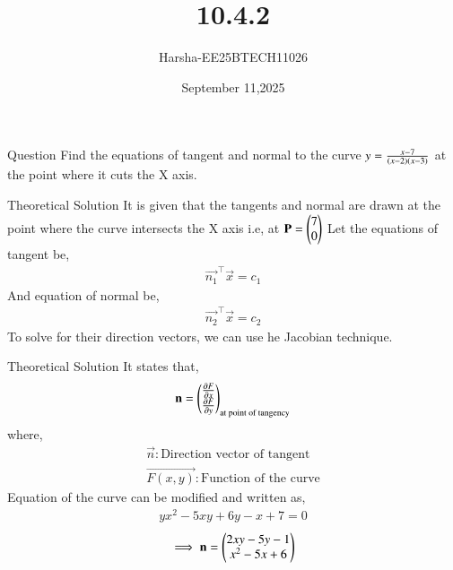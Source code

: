 \documentclass{beamer}
\title %
{10.4.2}
\date{September 11,2025}
\author %
{Harsha-EE25BTECH11026}
\begin{document}
\frame{\titlepage}


\begin{frame}{Question}
Find the equations of tangent and normal to the curve $y=\frac{x-7}{\left(x-2\right)\left(x-3\right)}$ at the point where it cuts the X axis.
\end{frame}

\begin{frame}{Theoretical Solution}
It is given that the tangents and normal are drawn at the point where the curve intersects the X axis i.e, at $\mathbf{P}=\begin{pmatrix}7\\0\end{pmatrix}$ 
Let the equations of tangent be,
\begin{align}
    \vec{n_1}^{\top}\vec{x}=c_1 \label{eq:1}
\end{align}
And equation of normal be,
\begin{align}
    \vec{n_2}^{\top}\vec{x}=c_2 \label{eq:2}
\end{align}
To solve for their direction vectors, we can use he Jacobian technique.

\end{frame}

\begin{frame}{Theoretical Solution}
It states that,
\begin{align}
    \mathbf{n}=\begin{pmatrix}\frac{\partial{F}}{\partial{x}}\\\frac{\partial{F}}{\partial{y}}\end{pmatrix}_{\text{at point of tangency}}
\end{align}
where,
\begin{align*}
    \vec{n}:\text{Direction vector of tangent}\\
    \vec{F(x,y)}:\text{Function of the curve}
\end{align*}
Equation of the curve can be modified and written as,
\begin{align}
    yx^2-5xy+6y-x+7=0
\end{align}
\begin{align}
    \implies \mathbf{n}=\begin{pmatrix}2xy-5y-1\\x^2-5x+6\end{pmatrix}
\end{align}

\end{frame}
\end{document}
